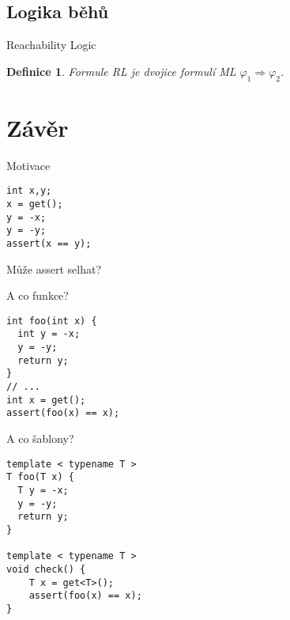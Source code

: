 \documentclass[11pt]{beamer}
\newtheorem{dfn}{Definice}
\begin{document}

\subsection{Logika běhů}

\begin{frame}{Reachability Logic}

\begin{dfn}
Formule RL je dvojice formulí ML $\varphi_1 \Rightarrow \varphi_2$.
\end{dfn}

\end{frame}


\section{Závěr}


\begin{frame}[fragile]{Motivace}

\begin{lstlisting}
int x,y;
x = get();
y = -x;
y = -y;
assert(x == y);
\end{lstlisting}

Může assert selhat?

\end{frame}


\begin{frame}[fragile]{A co funkce?}
\begin{lstlisting}
int foo(int x) {
  int y = -x;
  y = -y;
  return y;
}
// ...
int x = get();
assert(foo(x) == x);
\end{lstlisting}
\end{frame}


\begin{frame}[fragile]{A co šablony?}
\begin{lstlisting}
template < typename T >
T foo(T x) {
  T y = -x;
  y = -y;
  return y;
}

template < typename T >
void check() {
    T x = get<T>();
    assert(foo(x) == x);
}
\end{lstlisting}
\end{frame}
\end{document}
